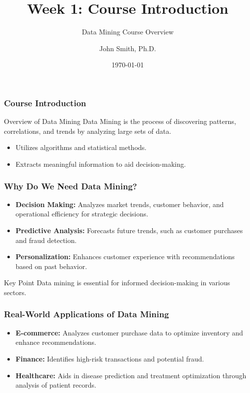 \documentclass[aspectratio=169]{beamer}
\begin{document}
\frame{\titlepage}

\begin{frame}[fragile]
    \title{Week 1: Course Introduction}
    \subtitle{Data Mining Course Overview}
    \author{John Smith, Ph.D.}
    \date{\today}
    \titlepage
\end{frame}

\begin{frame}[fragile]
    \frametitle{Course Introduction}
    \begin{block}{Overview of Data Mining}
        Data Mining is the process of discovering patterns, correlations, and trends by analyzing large sets of data.
    \end{block}
    \begin{itemize}
        \item Utilizes algorithms and statistical methods.
        \item Extracts meaningful information to aid decision-making.
    \end{itemize}
\end{frame}

\begin{frame}[fragile]
    \frametitle{Why Do We Need Data Mining?}
    \begin{itemize}
        \item \textbf{Decision Making:} Analyzes market trends, customer behavior, and operational efficiency for strategic decisions.
        \item \textbf{Predictive Analysis:} Forecasts future trends, such as customer purchases and fraud detection.
        \item \textbf{Personalization:} Enhances customer experience with recommendations based on past behavior.
    \end{itemize}
    \begin{block}{Key Point}
        Data mining is essential for informed decision-making in various sectors.
    \end{block}
\end{frame}

\begin{frame}[fragile]
    \frametitle{Real-World Applications of Data Mining}
    \begin{itemize}
        \item \textbf{E-commerce:} Analyzes customer purchase data to optimize inventory and enhance recommendations.
        \item \textbf{Finance:} Identifies high-risk transactions and potential fraud.
        \item \textbf{Healthcare:} Aids in disease prediction and treatment optimization through analysis of patient records.
    \end{itemize}
\end{frame}
\end{document}
